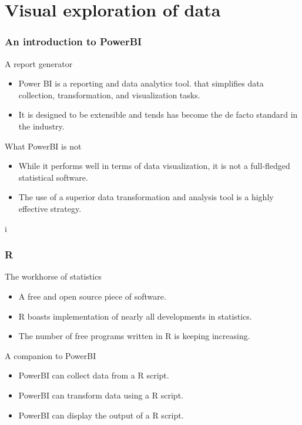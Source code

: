 \section{Visual exploration of data}
\begin{frame}
    \frametitle{An introduction to PowerBI}
\begin{block}{A report generator}
    \begin{itemize}
        \item<+-> Power BI is a reporting and data analytics tool.
        that simplifies data collection, transformation, 
        and visualization tasks.
        \item<+-> It is designed to be extensible and tends has become
        the de facto standard in the industry.
    \end{itemize}
\end{block}
\begin{block}{What PowerBI is not}
    \begin{itemize}
        \item<+-> While it performs well in terms of data visualization,
         it is not a full-fledged statistical software.
        \item<+-> The use of a superior data transformation
         and analysis tool is a highly effective strategy.
    \end{itemize}
\end{block}    i
\end{frame}
\begin{frame}
    \frametitle{R}
\begin{block}{The workhorse of statistics}
    \begin{itemize}
        \item<+-> A free and open source piece of software.
        \item<+->R boasts implementation of nearly all developments in statistics.
        \item<+-> The number of free programs written in R is keeping increasing.
    \end{itemize}
\end{block}
\begin{block}{A companion to PowerBI}
    \begin{itemize}
        \item<+-> PowerBI can collect data from a R script.
        \item<+-> PowerBI can transform data using a R script.
        \item<+-> PowerBI can display the output of a R script. 
    \end{itemize}
\end{block}    
\end{frame}
